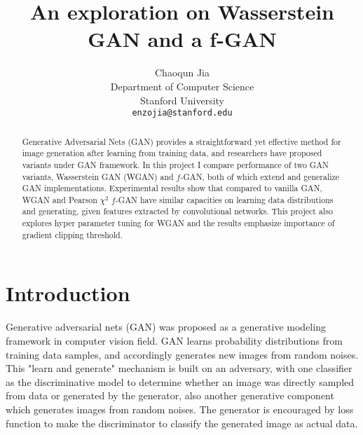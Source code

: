 \documentclass[10pt,twocolumn,letterpaper]{article}
\begin{document}
\title{An exploration on Wasserstein GAN and a f-GAN}

\author{Chaoqun Jia\\
Department of Computer Science\\
Stanford University\\
{\tt\small enzojia@stanford.edu}
}

\maketitle

\begin{abstract}
   Generative Adversarial Nets (GAN) provides a straightforward yet effective method for image generation after learning from training data, and researchers have proposed variants under GAN framework. In this project I compare performance of two GAN variants, Wasserstein GAN (WGAN) and $f$-GAN, both of which extend and generalize GAN implementations. Experimental results show that compared to vanilla GAN, WGAN and Pearson $\chi^2$ $f$-GAN have similar capacities on learning data distributions and generating, given features extracted by convolutional networks. This project also explores hyper parameter tuning for WGAN and the results emphasize importance of gradient clipping threshold.
   
\end{abstract}

\section{Introduction}

Generative adversarial nets (GAN)\cite{goodfellow2014generative} was proposed as a generative modeling framework in computer vision field. GAN learns probability distributions from training data samples, and accordingly generates new images from random noises. This "learn and generate" mechanism is built on an adversary, with one classifier as the discriminative model to determine whether an image was directly sampled from data or generated by the generator, also another generative component which generates images from random noises. The generator is encouraged by loss function to make the discriminator to classify the generated image as actual data. 
\end{document}
